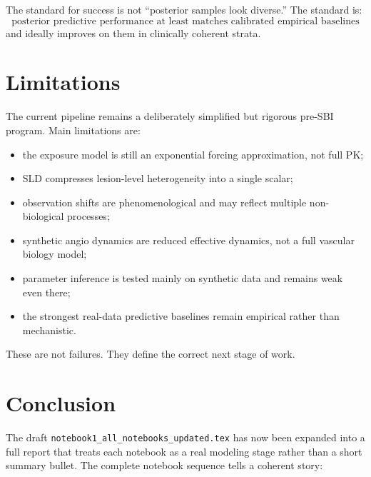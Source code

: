 \documentclass[11pt,a4paper]{article}
\newcommand{\sld}{\ensuremath{\mathrm{SLD}}}
\begin{document}
The standard for success is not ``posterior samples look diverse.'' The standard is:
\[
\text{posterior predictive performance at least matches calibrated empirical baselines}
\]
and ideally improves on them in clinically coherent strata.

\section{Limitations}

The current pipeline remains a deliberately simplified but rigorous pre-SBI program. Main limitations are:
\begin{itemize}[leftmargin=2em]
    \item the exposure model is still an exponential forcing approximation, not full PK;
    \item \sld{} compresses lesion-level heterogeneity into a single scalar;
    \item observation shifts are phenomenological and may reflect multiple non-biological processes;
    \item synthetic angio dynamics are reduced effective dynamics, not a full vascular biology model;
    \item parameter inference is tested mainly on synthetic data and remains weak even there;
    \item the strongest real-data predictive baselines remain empirical rather than mechanistic.
\end{itemize}

These are not failures. They define the correct next stage of work.

\section{Conclusion}

The draft \texttt{notebook1\_all\_notebooks\_updated.tex} has now been expanded into a full report that treats each notebook as a real modeling stage rather than a short summary bullet. The complete notebook sequence tells a coherent story:
\end{document}
